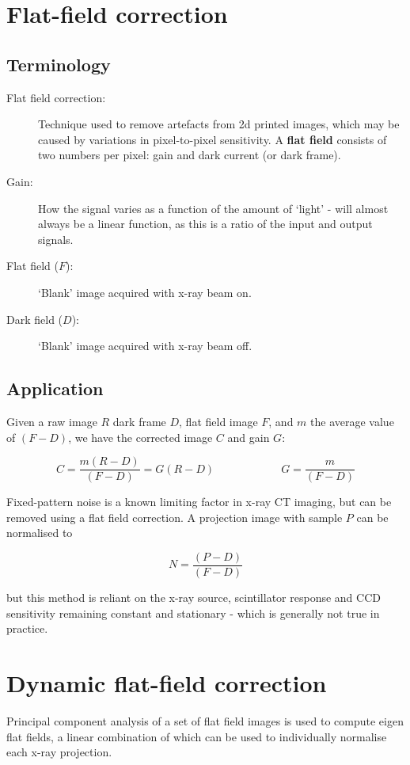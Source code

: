 \documentclass[10pt,fleqn]{article}
\begin{document}
\section{Flat-field correction \cite{wiki:FlatFieldCorrection}}

\subsection{Terminology}

\begin{description}
\item[Flat field correction: ] Technique used to remove artefacts from 2d printed images, which may be caused by variations in pixel-to-pixel sensitivity. A \textbf{flat field} consists of two numbers per pixel: gain and dark current (or dark frame).

\item[Gain: ] How the signal varies as a function of the amount of `light' - will almost always be a linear function, as this is a ratio of the input and output signals.

\item[Flat field ($F$): ] `Blank' image acquired with x-ray beam on.

\item[Dark field ($D$): ] `Blank' image acquired with x-ray beam off.

\end{description}

\subsection{Application}
Given a raw image $R$ dark frame $D$, flat field image $F$, and $m$ the average value of $(F-D)$, we have the corrected image $C$ and gain $G$:

\[ C = \frac{m(R-D)}{(F-D)} = G(R-D) \qquad \qquad \qquad G = \frac{m}{(F-D)}\]

Fixed-pattern noise is a known limiting factor in x-ray CT imaging, but can be removed using a flat field correction. A projection image with sample $P$ can be normalised to 

\[N = \frac{(P-D)}{(F-D)} \]

but this method is reliant on the x-ray source, scintillator response and CCD sensitivity remaining constant and stationary - which is generally not true in practice.

\section{Dynamic flat-field correction \cite{vanN2015}}
Principal component analysis of a set of flat field images is used to compute eigen flat fields, a linear combination of which can be used to individually normalise each x-ray projection.
\end{document}
